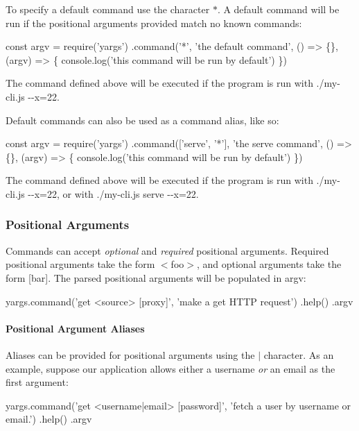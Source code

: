 To specify a default command use the character {\ttfamily $\ast$}. A default command will be run if the positional arguments provided match no known commands\+:


\begin{DoxyCode}
const argv = require('yargs')
  .command('*', 'the default command', () => \{\}, (argv) => \{
    console.log('this command will be run by default')
  \})
\end{DoxyCode}


The command defined above will be executed if the program is run with {\ttfamily ./my-\/cli.js -\/-\/x=22}.

Default commands can also be used as a command alias, like so\+:


\begin{DoxyCode}
const argv = require('yargs')
  .command(['serve', '*'], 'the serve command', () => \{\}, (argv) => \{
    console.log('this command will be run by default')
  \})
\end{DoxyCode}


The command defined above will be executed if the program is run with {\ttfamily ./my-\/cli.js -\/-\/x=22}, or with {\ttfamily ./my-\/cli.js serve -\/-\/x=22}.

\subsubsection*{Positional Arguments}

Commands can accept {\itshape optional} and {\itshape required} positional arguments. Required positional arguments take the form {\ttfamily $<$foo$>$}, and optional arguments take the form {\ttfamily \mbox{[}bar\mbox{]}}. The parsed positional arguments will be populated in {\ttfamily argv}\+:


\begin{DoxyCode}
yargs.command('get <source> [proxy]', 'make a get HTTP request')
  .help()
  .argv
\end{DoxyCode}


\paragraph*{Positional Argument Aliases}

Aliases can be provided for positional arguments using the {\ttfamily $\vert$} character. As an example, suppose our application allows either a username {\itshape or} an email as the first argument\+:


\begin{DoxyCode}
yargs.command('get <username|email> [password]', 'fetch a user by username or email.')
  .help()
  .argv
\end{DoxyCode}


